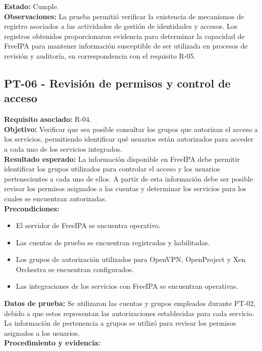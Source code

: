 \textbf{Estado:} Cumple.\\
\textbf{Observaciones:} La prueba permitió verificar la existencia de mecanismos de registro asociados a las actividades de gestión de identidades y accesos. Los registros obtenidos proporcionaron evidencia para determinar la capacidad de FreeIPA para mantener información susceptible de ser utilizada en procesos de revisión y auditoría, en correspondencia con el requisito R-05.

\subsection{PT-06 - Revisión de permisos y control de acceso}\label{subsec:pt06}
\textbf{Requisito asociado:} R-04.\\
\textbf{Objetivo:} Verificar que sea posible consultar los grupos que autorizan el acceso a los servicios, permitiendo identificar qué usuarios están autorizados para acceder a cada uno de los servicios integrados.\\
\textbf{Resultado esperado:} La información disponible en FreeIPA debe permitir identificar los grupos utilizados para controlar el acceso y los usuarios pertenecientes a cada uno de ellos. A partir de esta información debe ser posible revisar los permisos asignados a las cuentas y determinar los servicios para los cuales se encuentran autorizadas.\\
\textbf{Precondiciones:}
\begin{itemize}
	\item El servidor de FreeIPA se encuentra operativo.
	\item Las cuentas de prueba se encuentran registradas y habilitadas.
	\item Los grupos de autorización utilizados para OpenVPN, OpenProject y Xen Orchestra se encuentran configurados.
	\item Las integraciones de los servicios con FreeIPA se encuentran operativas.
\end{itemize}
\textbf{Datos de prueba:} Se utilizaron las cuentas y grupos empleados durante PT-02, debido a que estos representan las autorizaciones establecidas para cada servicio. La información de pertenencia a grupos se utilizó para revisar los permisos asignados a los usuarios.\\
\textbf{Procedimiento y evidencia:}
